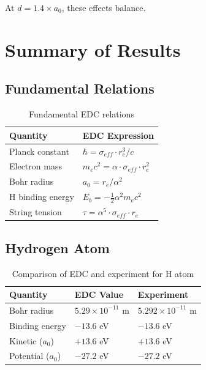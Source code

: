 \documentclass[12pt,a4paper]{article}
\begin{document}
At $d = 1.4 \times a_0$, these effects balance.

\section{Summary of Results}

\subsection{Fundamental Relations}

\begin{table}[h]
\centering
\begin{tabular}{@{}ll@{}}
\toprule
\textbf{Quantity} & \textbf{EDC Expression} \\
\midrule
Planck constant & $\hbar = \sigma_{eff} \cdot r_e^3 / c$ \\
Electron mass & $m_e c^2 = \alpha \cdot \sigma_{eff} \cdot r_e^2$ \\
Bohr radius & $a_0 = r_e / \alpha^2$ \\
H binding energy & $E_b = -\frac{1}{2}\alpha^2 m_e c^2$ \\
String tension & $\tau = \alpha^5 \cdot \sigma_{eff} \cdot r_e$ \\
\bottomrule
\end{tabular}
\caption{Fundamental EDC relations}
\end{table}

\subsection{Hydrogen Atom}

\begin{table}[h]
\centering
\begin{tabular}{@{}lll@{}}
\toprule
\textbf{Quantity} & \textbf{EDC Value} & \textbf{Experiment} \\
\midrule
Bohr radius & $5.29 \times 10^{-11}$ m & $5.292 \times 10^{-11}$ m \\
Binding energy & $-13.6$ eV & $-13.6$ eV \\
Kinetic ($a_0$) & $+13.6$ eV & $+13.6$ eV \\
Potential ($a_0$) & $-27.2$ eV & $-27.2$ eV \\
\bottomrule
\end{tabular}
\caption{Comparison of EDC and experiment for H atom}
\end{table}
\end{document}
